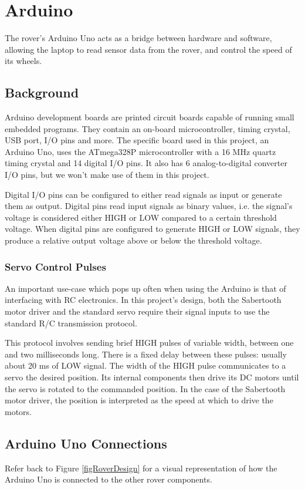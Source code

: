 \chapter{Arduino}

The rover's Arduino Uno acts as a bridge between hardware and software, allowing the laptop to read sensor data from the rover, and control the speed of its wheels.

\section{Background}
Arduino development boards are printed circuit boards capable of running small embedded programs. They contain an on-board microcontroller, timing crystal, USB port, I/O pins and more. The specific board used in this project, an Arduino Uno, uses the ATmega328P microcontroller with a 16 MHz quartz timing crystal and 14 digital I/O pins. It also has 6 analog-to-digital converter I/O pins, but we won't make use of them in this project. 

Digital I/O pins can be configured to either read signals as input or generate them as output. Digital pins read input signals as binary values, i.e. the signal's voltage is considered either HIGH or LOW compared to a certain threshold voltage. When digital pins are configured to generate HIGH or LOW signals, they produce a relative output voltage above or below the threshold voltage.

\subsection{Servo Control Pulses} \label{sectionRCPulses}
An important use-case which pops up often when using the Arduino is that of interfacing with RC electronics. In this project's design, both the Sabertooth motor driver and the standard servo require their signal inputs to use the standard R/C transmission protocol.

This protocol involves sending brief HIGH pulses of variable width, between one and two milliseconds long. There is a fixed delay between these pulses: usually about 20 ms of LOW signal. The width of the HIGH pulse communicates to a servo the desired position. Its internal components then drive its DC motors until the servo is rotated to the commanded position. In the case of the Sabertooth motor driver, the position is interpreted as the speed at which to drive the motors.

\section{Arduino Uno Connections}
Refer back to Figure \ref{figRoverDesign} for a visual representation of how the Arduino Uno is connected to the other rover components.

